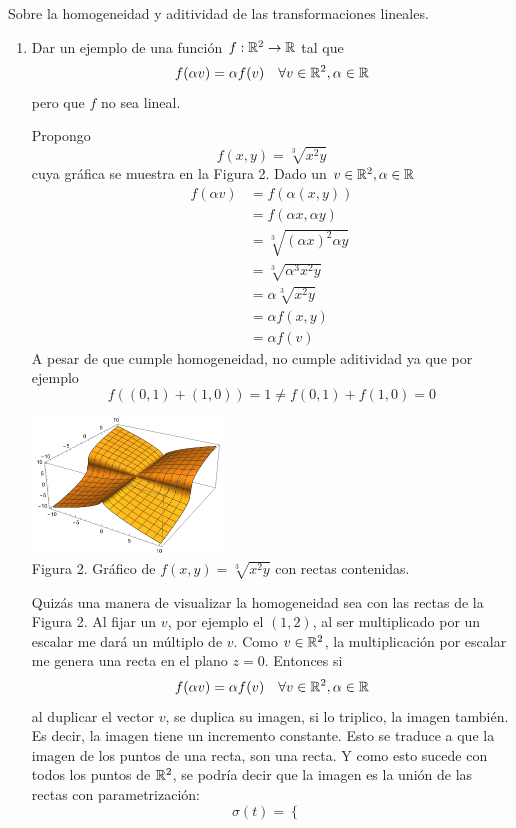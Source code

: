 \item Sobre la homogeneidad y aditividad de las transformaciones lineales.
    \begin{enumerate}
        \item Dar un ejemplo de una función $f:\mathbb{R}^2\to\mathbb{R}$ tal que \[f(\alpha v)=\alpha f(v)\quad\forall v\in\mathbb{R}^2,\alpha\in\mathbb{R}\] pero que $f$ no sea lineal.
            \begin{mdframed}[style=s]
                Propongo \[f(x,y)=\sqrt[3]{x^2y}\]
                cuya gráfica se muestra en la Figura 2. Dado un $v\in\mathbb{R}^2,\alpha\in\mathbb{R}$
                \begin{align*}
                    f(\alpha v)&=f(\alpha(x,y))\\
                    &=f(\alpha x,\alpha y)\\
                    &=\sqrt[3]{(\alpha x)^2\alpha y}\\
                    &=\sqrt[3]{\alpha^3x^2y}\\
                    &=\alpha\sqrt[3]{x^2y}\\
                    &=\alpha f(x,y)\\
                    &=\alpha f(v)
                \end{align*}
                A pesar de que cumple homogeneidad, no cumple aditividad ya que por ejemplo \[f((0,1)+(1,0))=1\neq f(0,1)+f(1,0)=0\]
                \begin{center}
                    \includegraphics[width=0.4\textwidth]{img/ej10a.png}\\
                    Figura 2. Gráfico de $f(x,y)=\sqrt[3]{x^2y}$ con rectas contenidas.
                \end{center}
                Quizás una manera de visualizar la homogeneidad sea con las rectas de la Figura 2. Al fijar un $v$, por ejemplo el $(1,2)$, al ser multiplicado por un escalar me dará un múltiplo de $v$. Como $v\in\mathbb{R}^2$, la multiplicación por escalar me genera una recta en el plano $z=0$. Entonces si \[f(\alpha v)=\alpha f(v)\quad\forall v\in\mathbb{R}^2,\alpha\in\mathbb{R}\]
                al duplicar el vector $v$, se duplica su imagen, si lo triplico, la imagen también. Es decir, la imagen tiene un incremento constante. Esto se traduce a que la imagen de los puntos de una recta, son una recta. Y como esto sucede con todos los puntos de $\mathbb{R}^2$, se podría decir que la imagen es la unión de las rectas con parametrización:\[\sigma(t)=\left\{\begin{matrix}

\end{matrix}\]
\end{mdframed}
\end{enumerate}
